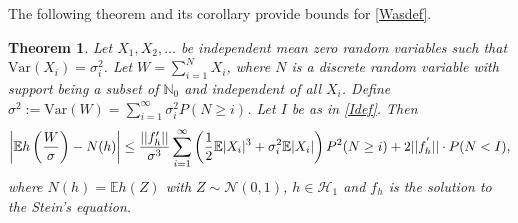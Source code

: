 \documentclass[pdflatex,sn-mathphys-ay]{sn-jnl}
\newcommand{\E}{\mathbb{E}}
\newcommand{\Var}{\mathrm{Var}}
\newtheorem{theorem}{Theorem}[section]
\theoremstyle{thmstyleone}%
\newtheorem{theorem}{Theorem}%
\theoremstyle{thmstyletwo}%
\theoremstyle{thmstylethree}%
\begin{document}
The following theorem and its corollary provide bounds for \eqref{Wasdef}.

\begin{theorem}\label{uniform}
	Let $X_1,X_2,\ldots$ be independent mean zero random variables such that $\Var(X_i) = \sigma_i^2$. Let $W=\sum_{i=1}^NX_i$, where $N$ is a discrete random variable with support being a subset of $\mathbb{N}_0$ and independent of all $X_i$.
		Define $\sigma^2 := \Var(W) = \sum_{i=1}^\infty\sigma_i^2 P(N\ge i)$. Let $I$ be as in \eqref{Idef}.  Then
	\begin{align*}
		\left|\E h\left(\frac{W}{\sigma}\right)-N(h)\right|\leq \frac{||f'_h||}{\sigma^3}\sum_{i=1}^\infty \left({1\over 2}\E|X_i|^3+ \sigma_i^2\E|X_i| \right)P^2(N\ge i)+2 ||f^{'}_{h}|| \cdot {P(N < I)},
	\end{align*}
	where $N(h) = \E h(Z)$ with $Z \sim \mathcal{N}(0,1)$, $h \in \mathcal{H}_1$ and $f_h$ is the solution to the Stein's equation.
	\end{theorem}
\end{document}
